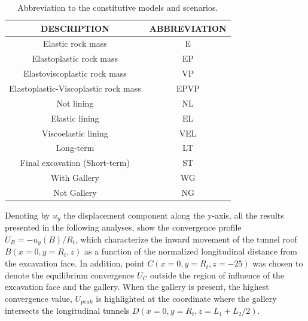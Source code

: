 \documentclass[a4paper,fleqn]{cas-sc}
\begin{document}
\FloatBarrier
\begin{table}[h!]
	\caption{Abbreviation to the constitutive models and scenarios.}
	\label{table3}
	\centering
	\renewcommand{\arraystretch}{1.25}
	\begin{tabular}{c c}
		\hline
		\multicolumn{1}{c}{DESCRIPTION} &
		\multicolumn{1}{c}{ABBREVIATION} \\
		\hline
		Elastic rock mass & E \\
		Elastoplastic rock mass & EP \\
		Elastoviscoplastic rock mass & VP \\
		Elastoplastic-Viscoplastic rock mass & EPVP \\
		Not lining & NL \\
		Elastic lining & EL \\
		Viscoelastic lining & VEL \\
		Long-term & LT \\
		Final excavation (Short-term) & ST \\
		With Gallery & WG \\
		Not Gallery & NG \\			
		\hline
	\end{tabular}
	\normalsize
\end{table}
\FloatBarrier

Denoting by $u_y$ the displacement component along the y-axis, all the results presented in the following analyses, show the convergence profile $U_B = -u_y(B)/R_t$, which characterize the inward movement of the tunnel roof $B(x = 0, y = R_t, z)$ as a function of the normalized longitudinal distance from the excavation face. In addition, point $C(x=0, y =R_t, z = -25)$ was chosen to denote the equilibrium convergence $U_C$ outside the region of influence of the excavation face and the gallery. When the gallery is present, the highest convergence value, $U_{peak}$ is highlighted at the coordinate where the gallery intersects the longitudinal tunnels $D(x=0, y = R_t, z = L_1+L_2/2)$.
\end{document}

